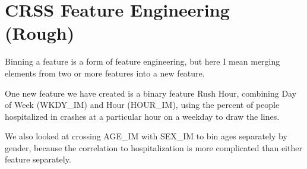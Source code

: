\section{CRSS Feature Engineering (Rough)}


Binning a feature is a form of feature engineering, but here I mean merging elements from two or more features into a new feature.  

One new feature we have created is a binary feature Rush Hour, combining Day of Week (WKDY\_IM) and Hour (HOUR\_IM), using the percent of people hospitalized in crashes at a particular hour on a weekday to draw the lines.  

We also looked at crossing AGE\_IM with SEX\_IM to bin ages separately by gender, because the correlation to hospitalization is more complicated than either feature separately.  